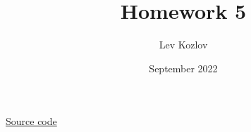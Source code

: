 \documentclass{article}
\title{Homework 5}
\author{Lev Kozlov}
\date{September 2022}
\begin{document}
\maketitle

\href{https://github.com/lvjonok/f22-theoretical-mechanics/tree/master/homework5}{Source code}



\newpage



\newpage


\end{document}
